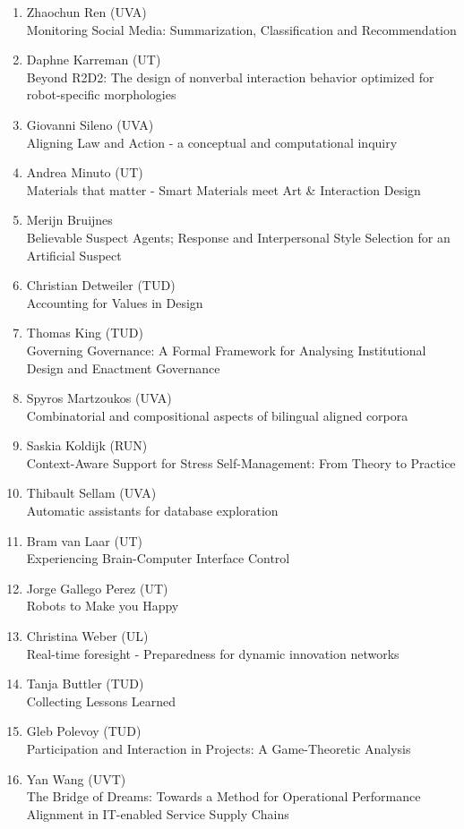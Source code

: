 \begin{multicols}{2}
\begin{scriptsize}
\begin{enumerate}[label=\textbf{2016-\arabic*},leftmargin=0cm,itemindent=1.15cm,labelwidth=\itemindent,labelsep=0cm,align=left,noitemsep]
\item Zhaochun Ren (UVA)   \\
	Monitoring Social Media: Summarization, Classification and Recommendation 
\item Daphne Karreman (UT)   \\
	Beyond R2D2: The design of nonverbal interaction behavior optimized for robot-specific morphologies 
\item Giovanni Sileno (UVA)   \\
	Aligning Law and Action - a conceptual and computational inquiry 
\item Andrea Minuto (UT)   \\
	Materials that matter - Smart Materials meet Art \& Interaction Design
\item Merijn Bruijnes   \\
	Believable Suspect Agents; Response and Interpersonal Style Selection for an Artificial Suspect 

\item Christian Detweiler (TUD)   \\
	Accounting for Values in Design
\item Thomas King (TUD)   \\
	Governing Governance: A Formal Framework for Analysing Institutional Design and Enactment Governance 
\item Spyros Martzoukos (UVA)   \\
	Combinatorial and compositional aspects of bilingual aligned corpora
\item Saskia Koldijk (RUN)   \\
	Context-Aware Support for Stress Self-Management: From Theory to Practice 
\item Thibault Sellam (UVA)   \\
	Automatic assistants for database exploration 
\item Bram van Laar (UT)   \\
	Experiencing Brain-Computer Interface Control
	
\item Jorge Gallego Perez (UT)   \\
	Robots to Make you Happy
\item Christina Weber (UL)    \\
	Real-time foresight - Preparedness for dynamic innovation networks
\item Tanja Buttler (TUD)   \\
	Collecting Lessons Learned
\item Gleb Polevoy (TUD)   \\
	Participation and Interaction in Projects: A Game-Theoretic Analysis
\item Yan Wang (UVT)   \\
	The Bridge of Dreams: Towards a Method for Operational Performance Alignment in IT-enabled Service Supply Chains 
\end{enumerate}


\end{scriptsize}
\end{multicols}

